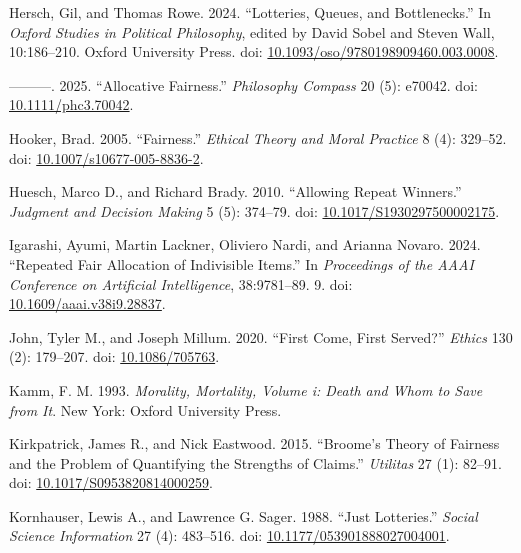 \documentclass[
  11pt,
  letterpaper,
  DIV=11,
  numbers=noendperiod,
  twoside]{scrartcl}
\newlength{\cslhangindent}
\newenvironment{CSLReferences}[2] %
 {\begin{list}{}{%
  \setlength{\itemindent}{0pt}
  \setlength{\leftmargin}{0pt}
  \setlength{\parsep}{0pt}
  \ifodd #1
   \setlength{\leftmargin}{\cslhangindent}
   \setlength{\itemindent}{-1\cslhangindent}
  \fi
  \setlength{\itemsep}{#2\baselineskip}}}
 {\end{list}}
\begin{document}
\begin{CSLReferences}{1}{0}
Hersch, Gil, and Thomas Rowe. 2024. {``Lotteries, Queues, and
Bottlenecks.''} In \emph{Oxford Studies in Political Philosophy}, edited
by David Sobel and Steven Wall, 10:186--210. Oxford University Press.
doi:
\href{https://doi.org/10.1093/oso/9780198909460.003.0008}{10.1093/oso/9780198909460.003.0008}.

---------. 2025. {``Allocative Fairness.''} \emph{Philosophy Compass} 20
(5): e70042. doi:
\href{https://doi.org/10.1111/phc3.70042}{10.1111/phc3.70042}.

Hooker, Brad. 2005. {``Fairness.''} \emph{Ethical Theory and Moral
Practice} 8 (4): 329--52. doi:
\href{https://doi.org/10.1007/s10677-005-8836-2}{10.1007/s10677-005-8836-2}.

Huesch, Marco D., and Richard Brady. 2010. {``Allowing Repeat
Winners.''} \emph{Judgment and Decision Making} 5 (5): 374--79. doi:
\href{https://doi.org/10.1017/S1930297500002175}{10.1017/S1930297500002175}.

Igarashi, Ayumi, Martin Lackner, Oliviero Nardi, and Arianna Novaro.
2024. {``Repeated Fair Allocation of Indivisible Items.''} In
\emph{Proceedings of the AAAI Conference on Artificial Intelligence},
38:9781--89. 9. doi:
\href{https://doi.org/10.1609/aaai.v38i9.28837}{10.1609/aaai.v38i9.28837}.

John, Tyler M., and Joseph Millum. 2020. {``First Come, First Served?''}
\emph{Ethics} 130 (2): 179--207. doi:
\href{https://doi.org/10.1086/705763}{10.1086/705763}.

Kamm, F. M. 1993. \emph{Morality, Mortality, Volume i: Death and Whom to
Save from It}. New York: Oxford University Press.

Kirkpatrick, James R., and Nick Eastwood. 2015. {``Broome's Theory of
Fairness and the Problem of Quantifying the Strengths of Claims.''}
\emph{Utilitas} 27 (1): 82--91. doi:
\href{https://doi.org/10.1017/S0953820814000259}{10.1017/S0953820814000259}.

Kornhauser, Lewis A., and Lawrence G. Sager. 1988. {``Just Lotteries.''}
\emph{Social Science Information} 27 (4): 483--516. doi:
\href{https://doi.org/10.1177/053901888027004001}{10.1177/053901888027004001}.


\end{CSLReferences}
\end{document}
